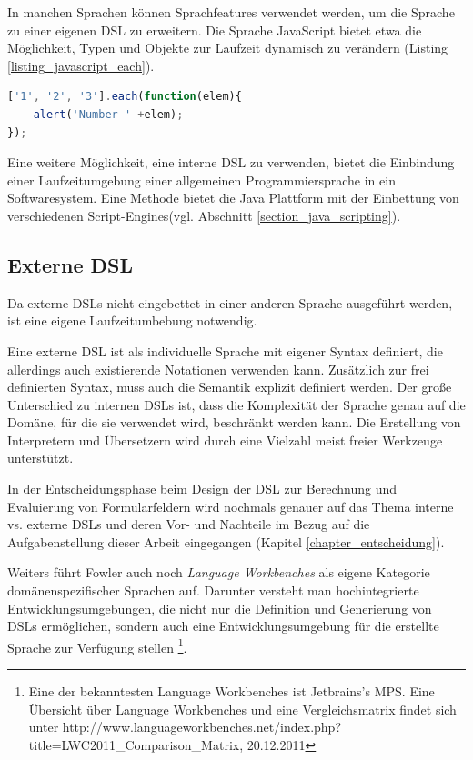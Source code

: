 In manchen Sprachen können Sprachfeatures verwendet werden, um die Sprache zu einer eigenen DSL zu erweitern. Die Sprache Java\-Script bietet etwa die Möglichkeit, Typen und Objekte zur Laufzeit dynamisch zu verändern (Listing \ref{listing_javascript_each}).\\

\begin{lstlisting}[language=JavaScript, caption={Erweiterung des Array-Typs um die Funktion \texttt{each()} in der Java\-Script Bibliothek Prototype},label=listing_javascript_each]
['1', '2', '3'].each(function(elem){
	alert('Number ' +elem);
});
\end{lstlisting}

Eine weitere Möglichkeit, eine interne DSL zu verwenden, bietet die Einbindung einer Laufzeitumgebung einer allgemeinen Programmiersprache in ein Softwaresystem. Eine Methode bietet die Java Plattform mit der Einbettung von verschiedenen Script-Engines(vgl. Abschnitt \ref{section_java_scripting}).

\subsection{Externe DSL} 

Da externe DSLs nicht eingebettet in einer anderen Sprache ausgeführt werden, ist eine eigene Laufzeitumbebung not\-wen\-dig. 

Eine externe DSL ist als individuelle Sprache mit eigener Syntax definiert, die allerdings auch existierende Notationen verwenden kann. Zu\-sätz\-lich zur frei definierten Syntax, muss auch die Semantik explizit definiert werden. Der große Unterschied zu internen DSLs ist, dass die Komplexität der Sprache genau auf die Domäne, für die sie verwendet wird, beschränkt werden kann. Die Erstellung von Interpretern und Übersetzern wird durch eine Vielzahl meist freier Werkzeuge unterstützt.

In der Entscheidungsphase beim Design der DSL zur Berechnung und Eva\-lu\-ier\-ung von Formularfeldern wird nochmals genauer 
auf das Thema interne vs. externe DSLs und deren Vor- und Nachteile im Bezug auf die Aufgabenstellung dieser 
Arbeit eingegangen (Kapitel \ref{chapter_entscheidung}).

Weiters führt Fowler auch noch \textit{Language Workbenches} als eigene Kategorie domänenspezifischer Sprachen auf. 
Darunter versteht man hochintegrierte Entwicklungsumgebungen, die nicht nur die Definition und Generierung von DSLs ermöglichen, 
sondern auch eine Entwicklungsumgebung für die erstellte Sprache zur Verfügung stellen
\footnote{Eine der bekanntesten Language Workbenches ist Jetbrains's MPS. Eine Über\-sicht über Language Workbenches und eine 
Vergleichsmatrix findet sich unter http://www.languageworkbenches.net/index.php?title=LWC2011\_Comparison\_Matrix, 20.12.2011}.



